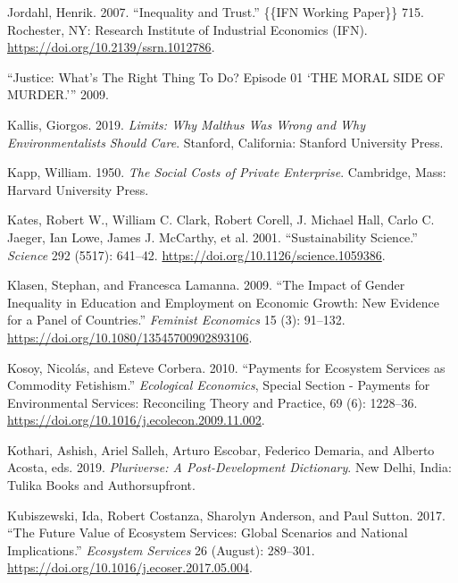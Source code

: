 \documentclass[
  a4paper,
  openany]{book}
\newlength{\cslhangindent}
\newenvironment{CSLReferences}[2] %
 {\begin{list}{}{%
  \setlength{\itemindent}{0pt}
  \setlength{\leftmargin}{0pt}
  \setlength{\parsep}{0pt}
  \ifodd #1
   \setlength{\leftmargin}{\cslhangindent}
   \setlength{\itemindent}{-1\cslhangindent}
  \fi
  \setlength{\itemsep}{#2\baselineskip}}}
 {\end{list}}
\begin{document}
\begin{CSLReferences}{1}{0}
Jordahl, Henrik. 2007. {``Inequality and {Trust}.''} \{\{IFN Working
Paper\}\} 715. Rochester, NY: Research Institute of Industrial Economics
(IFN). \url{https://doi.org/10.2139/ssrn.1012786}.

{``Justice: {What}'s {The Right Thing To Do}? {Episode} 01 {`{THE MORAL
SIDE OF MURDER}.'}''} 2009.

Kallis, Giorgos. 2019. \emph{Limits: {Why Malthus Was Wrong} and {Why
Environmentalists Should Care}}. Stanford, California: Stanford
University Press.

Kapp, William. 1950. \emph{The {Social Costs} of {Private Enterprise}}.
Cambridge, Mass: Harvard University Press.

Kates, Robert W., William C. Clark, Robert Corell, J. Michael Hall,
Carlo C. Jaeger, Ian Lowe, James J. McCarthy, et al. 2001.
{``Sustainability {Science}.''} \emph{Science} 292 (5517): 641--42.
\url{https://doi.org/10.1126/science.1059386}.

Klasen, Stephan, and Francesca Lamanna. 2009. {``The {Impact} of {Gender
Inequality} in {Education} and {Employment} on {Economic Growth}: {New
Evidence} for a {Panel} of {Countries}.''} \emph{Feminist Economics} 15
(3): 91--132. \url{https://doi.org/10.1080/13545700902893106}.

Kosoy, Nicolás, and Esteve Corbera. 2010. {``Payments for Ecosystem
Services as Commodity Fetishism.''} \emph{Ecological Economics}, Special
{Section} - {Payments} for {Environmental Services}: {Reconciling
Theory} and {Practice}, 69 (6): 1228--36.
\url{https://doi.org/10.1016/j.ecolecon.2009.11.002}.

Kothari, Ashish, Ariel Salleh, Arturo Escobar, Federico Demaria, and
Alberto Acosta, eds. 2019. \emph{Pluriverse: A Post-Development
Dictionary}. New Delhi, India: {Tulika Books and Authorsupfront}.

Kubiszewski, Ida, Robert Costanza, Sharolyn Anderson, and Paul Sutton.
2017. {``The Future Value of Ecosystem Services: {Global} Scenarios and
National Implications.''} \emph{Ecosystem Services} 26 (August):
289--301. \url{https://doi.org/10.1016/j.ecoser.2017.05.004}.


\end{CSLReferences}
\end{document}

